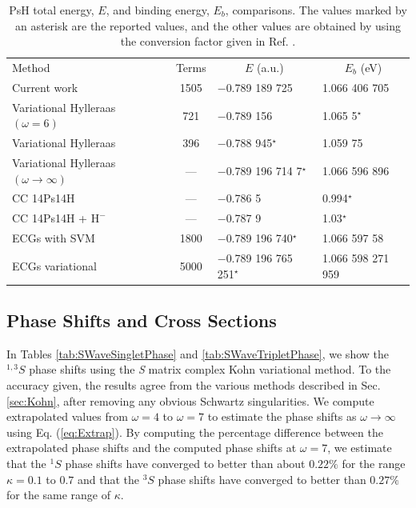 \documentclass[preprint,showpacs,showkeys,preprintnumbers,amsmath,amssymb,longbibliography,pra,aps]{revtex4-1}
\newcommand*{\thead}[1]{\multicolumn{1}{c}{#1}}
\begin{document}
\squeezetable  %
\begin{table}
\begin{center}
\begin{ruledtabular}  %
\begin{tabular}{l c l l}
Method & Terms & \thead{$E$ (a.u.)} & \thead{$E_b$ (eV)}\\
\colrule
Current work & 1505 & $-$0.789 189 725 & 1.066 406 705 \\
Variational Hylleraas $(\omega = 6)$ \cite{VanReeth2003} & 721 & $-$0.789 156 & 1.065 5$^\star$ \\
Variational Hylleraas \cite{Ho1986} & 396 & $-$0.788 945$^\star$ & 1.059 75 \\
Variational Hylleraas $(\omega \rightarrow \infty)$ \cite{Yan1999} & --- & $-$0.789 196 714 7$^\star$ & 1.066 596 896 \\
CC 14Ps14H \cite{Blackwood2002} & --- & $-$0.786 5 & 0.994$^\star$ \\
CC 14Ps14H + $\text{H}^-$ \cite{Walters2004} & --- & $-$0.787 9 & 1.03$^\star$\\
ECGs with SVM \cite{Mitroy2006} & 1800 & $-$0.789 196 740$^\star$ & 1.066 597 58 \\
ECGs variational \cite{Bubin2006} & 5000 & $-$0.789 196 765 251$^\star$ & 1.066 598 271 959 \\
\end{tabular}
\end{ruledtabular}
\caption{PsH total energy, $E$, and binding energy, $E_b$, comparisons.
The values marked by an asterisk are the
reported values, and the other values are obtained by using the conversion
factor given in Ref. \cite{Mohr2012,*NISTConversions}.}
\label{tab:BoundEnergy}
\end{center}
\end{table}

\subsection{Phase Shifts and Cross Sections}

In Tables \ref{tab:SWaveSingletPhase} and \ref{tab:SWaveTripletPhase}, we 
show the $^{1,3}S$ phase shifts using the \emph{S} matrix complex Kohn 
variational method. To the accuracy given, the results agree from the various 
methods described in Sec. \ref{sec:Kohn}, after removing any obvious Schwartz 
singularities. We compute extrapolated values from $\omega = 4$ to
$\omega = 7$
to estimate the phase shifts as $\omega \rightarrow \infty$ using Eq.
(\ref{eq:Extrap}). By computing the percentage difference between the extrapolated 
phase shifts and the computed phase shifts at $\omega=7$, we estimate that 
the $^1S$ phase shifts have converged to better than about $0.22\%$ for the 
range $\kappa=0.1$ to $0.7$ and that the $^3S$ phase shifts have converged to 
better than $0.27\%$ for the same range of $\kappa$.
\end{document}
